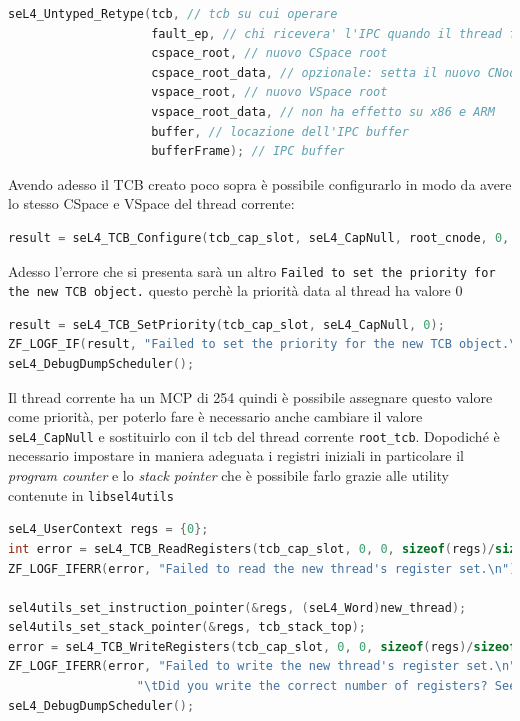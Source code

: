 \begin{lstlisting}[language=C++]
seL4_Untyped_Retype(tcb, // tcb su cui operare
					fault_ep, // chi ricevera' l'IPC quando il thread fallisce
					cspace_root, // nuovo CSpace root
					cspace_root_data, // opzionale: setta il nuovo CNode
					vspace_root, // nuovo VSpace root
					vspace_root_data, // non ha effetto su x86 e ARM
					buffer, // locazione dell'IPC buffer
					bufferFrame); // IPC buffer
\end{lstlisting} 


Avendo adesso il TCB creato poco sopra è possibile configurarlo in modo da avere lo stesso CSpace e VSpace del thread corrente:
\begin{lstlisting}[language=C++]
result = seL4_TCB_Configure(tcb_cap_slot, seL4_CapNull, root_cnode, 0, root_vspace, 0, (seL4_Word) thread_ipc_buff_sym, tcb_ipc_frame);
\end{lstlisting}
Adesso l'errore che si presenta sarà un altro \texttt{Failed to set the priority for the new TCB object.} questo perchè la priorità data al thread ha valore 0
\begin{lstlisting}[language=C++]
result = seL4_TCB_SetPriority(tcb_cap_slot, seL4_CapNull, 0);
ZF_LOGF_IF(result, "Failed to set the priority for the new TCB object.\n");
seL4_DebugDumpScheduler();
\end{lstlisting}
Il thread corrente ha un MCP di 254 quindi è possibile assegnare questo valore come priorità, per poterlo fare è necessario anche cambiare il valore \texttt{seL4\_CapNull} e sostituirlo con il tcb del thread corrente \texttt{root\_tcb}.
Dopodiché è necessario impostare in maniera adeguata i registri iniziali in particolare il \textit{program counter} e lo \textit{stack pointer} che è possibile farlo grazie alle utility contenute in \texttt{libsel4utils}
\begin{lstlisting}[language=C++]
seL4_UserContext regs = {0};
int error = seL4_TCB_ReadRegisters(tcb_cap_slot, 0, 0, sizeof(regs)/sizeof(seL4_Word), &regs);
ZF_LOGF_IFERR(error, "Failed to read the new thread's register set.\n");

sel4utils_set_instruction_pointer(&regs, (seL4_Word)new_thread);
sel4utils_set_stack_pointer(&regs, tcb_stack_top);
error = seL4_TCB_WriteRegisters(tcb_cap_slot, 0, 0, sizeof(regs)/sizeof(seL4_Word), &regs);
ZF_LOGF_IFERR(error, "Failed to write the new thread's register set.\n"
                  "\tDid you write the correct number of registers? See arg4.\n");
seL4_DebugDumpScheduler();
\end{lstlisting}
